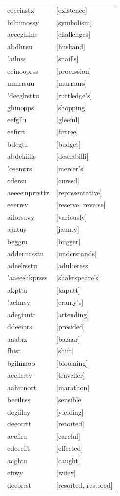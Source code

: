 \documentclass{article}
\begin{document}
\begin{tabular}{ll}
ceeeinstx & [existence] \\
bilmmossy & [symbolism] \\
aceeghllns & [challenges] \\
abdhnsu & [husband] \\
'ailnss & [snail's] \\
ceinooprss & [procession] \\
mmrrsuu & [murmurs] \\
'deeglrsttu & [ruttledge's] \\
ghinopps & [shopping] \\
eefgllu & [gleeful] \\
eefirrt & [firtree] \\
bdegtu & [budget] \\
abdehiills & [deshabilli] \\
'ceemrrs & [mercer's] \\
cdersu & [cursed] \\
aeeeeinprrsttv & [representative] \\
eeerrsv & [reserve, reverse] \\
ailorsuvy & [variously] \\
ajntuy & [jaunty] \\
beggru & [bugger] \\
addennrsstu & [understands] \\
adeelrsstu & [adulteress] \\
'aaeeehkprsss & [shakespeare's] \\
akpttu & [kaputt] \\
'aclnrsy & [cranly's] \\
adeginntt & [attending] \\
ddeeiprs & [presided] \\
aaabrz & [bazaar] \\
fhist & [shift] \\
bgilmnoo & [blooming] \\
aeellrrtv & [traveller] \\
aahmnort & [marathon] \\
beeilnss & [sensible] \\
degiilny & [yielding] \\
deeorrtt & [retorted] \\
aceflru & [careful] \\
cdeeefft & [effected] \\
acghtu & [caught] \\
efiwy & [wifey] \\
deeorrst & [resorted, restored] \\

\end{tabular}
\end{document}
